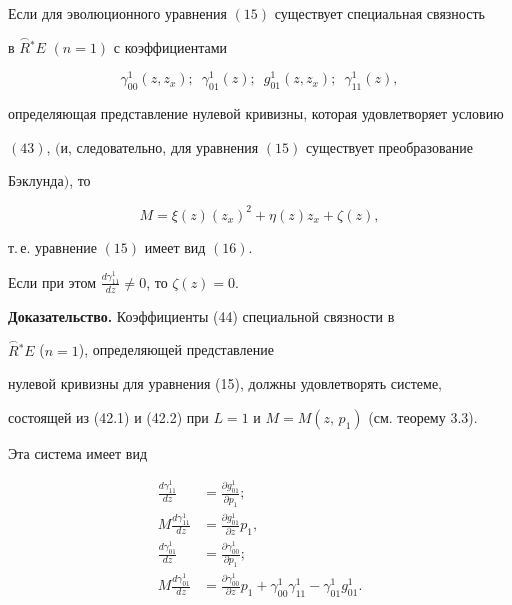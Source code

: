 \begin{lems}


Если для эволюционного уравнения $(15)$ существует специальная связность 


в $\overset{\frown}{R}{}^*E$ $(n=1)$ с коэффициентами


\begin{equation}


\gamma_{00}^1 ({z,z_x});\ \; \gamma_{01}^1 (z);\ \; g_{01}^1 ({z,z_x});


\ \; \gamma_{11}^1 (z),


\end{equation}


определяющая представление нулевой кривизны, которая удовлетворяет условию


$(43)$, $($и, следовательно, для уравнения $(15)$ существует преобразование 


Бэклунда$)$, то


$$


M=\xi (z) ({z_x})^2+\eta (z) z_x+\zeta (z),


$$


т.\,е. уравнение $(15)$ имеет вид $(16)$.


Если при этом $\frac{{d\gamma_{11}^1}}{{dz}} \ne 0$, то $\zeta (z)=0$.


\end{lems}





{\bf Доказательство.} Коэффициенты (44) специальной связности в


$\overset{\frown}{R}{}^*E$ (${n=1}$), определяющей представление 


нулевой кривизны для уравнения (15), должны удовлетворять системе, 


состоящей из (42.1) и (42.2) при $L=1$ и $M=M(z,\,p_1)$ (см. теорему 3.3).


Эта система имеет вид


\begin{equation}


\begin{split}


\frac{{d\gamma_{11}^1}}{{dz}}&=\frac{{\partial g_{01}^1}}{{\partial p_1}};\\


M \frac{{d\gamma_{11}^1}}{{dz}}&=


\frac{{\partial g_{01}^1}}{{\partial z}} p_1,\\


\frac{{d\gamma_{01}^1}}{{dz}}&=\frac{{\partial \gamma_{00}^1}}{{\partial p_1}};\\


M \frac{{d\gamma_{01}^1}}{{dz}}&=


\frac{{\partial \gamma_{00}^1}}{{\partial z}}


p_1+\gamma_{00}^1 \gamma_{11}^1-\gamma_{01}^1 g_{01}^1.


\end{split} 


\end{equation}





